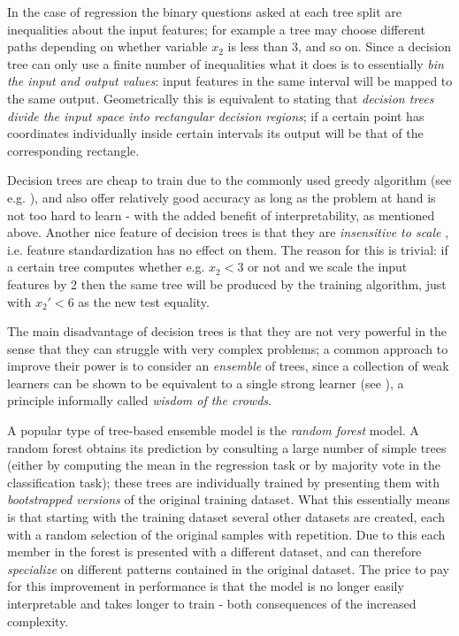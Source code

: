 In the case of regression the binary questions asked at each tree split are inequalities about the input features; for example a tree may choose different paths depending on whether variable $x_2$ is less than 3, and so on.
Since a decision tree can only use a finite number of inequalities what it does is to essentially \emph{bin the input and output values}: input features in the same interval will be mapped to the same output. Geometrically this is equivalent to stating that \emph{decision trees divide the input space into rectangular decision regions}; if a certain point has coordinates individually inside certain intervals its output will be that of the corresponding rectangle.

Decision trees are cheap to train due to the commonly used greedy algorithm (see e.g. \cite{islp}), and also offer relatively good accuracy as long as the problem at hand is not too hard to learn - with the added benefit of interpretability, as mentioned above. Another nice feature of decision trees is that they are \emph{insensitive to scale} \cite{islp}, i.e. feature standardization has no effect on them. The reason for this is trivial: if a certain tree computes whether e.g. $x_2<3$ or not and we scale the input features by 2 then the same tree will be produced by the training algorithm, just with $x_2'<6$ as the new test equality.


The main disadvantage of decision trees is that they are not very powerful in the sense that they can struggle with very complex problems; a common approach to improve their power is to consider an \emph{ensemble} of trees, since a collection of weak learners can be shown to be equivalent to a single strong learner (see \cite{understanding_ml}), a principle informally called \emph{wisdom of the crowds}.

A popular type of tree-based ensemble model is the \emph{random forest} model. A random forest obtains its prediction by consulting a large number of simple trees (either by computing the mean in the regression task or by majority vote in the classification task); these trees are individually trained by presenting them with \emph{bootstrapped versions} of the original training dataset. What this essentially means is that starting with the training dataset several other datasets are created, each with a random selection of the original samples with repetition. Due to this each member in the forest is presented with a different dataset, and can therefore \emph{specialize} on different patterns contained in the original dataset. 
The price to pay for this improvement in performance is that the model is no longer easily interpretable and takes longer to train - both consequences of the increased complexity.

